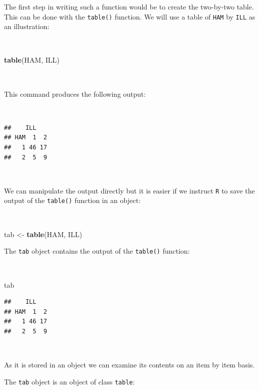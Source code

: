 \documentclass[12pt,a4paper]{book}
\newenvironment{Shaded}{\begin{snugshade}}{\end{snugshade}}
\newcommand{\KeywordTok}[1]{\textcolor[rgb]{0.13,0.29,0.53}{\textbf{#1}}}
\newcommand{\NormalTok}[1]{#1}
\newcommand{\StringTok}[1]{\textcolor[rgb]{0.31,0.60,0.02}{#1}}
\theoremstyle{definition}
\theoremstyle{definition}
\theoremstyle{definition}
\theoremstyle{remark}
\begin{document}
The first step in writing such a function would be to create the
two-by-two table. This can be done with the \texttt{table()} function.
We will use a table of \texttt{HAM} by \texttt{ILL} as an illustration:

~

\begin{Shaded}
\begin{Highlighting}[]
\KeywordTok{table}\NormalTok{(HAM, ILL)}
\end{Highlighting}
\end{Shaded}

~

This command produces the following output:

~

\begin{verbatim}
##    ILL
## HAM  1  2
##   1 46 17
##   2  5  9
\end{verbatim}

~

We can manipulate the output directly but it is easier if we instruct
\texttt{R} to save the output of the \texttt{table()} function in an
object:

~

\begin{Shaded}
\begin{Highlighting}[]
\NormalTok{tab <-}\StringTok{ }\KeywordTok{table}\NormalTok{(HAM, ILL)}
\end{Highlighting}
\end{Shaded}

\newpage

The \texttt{tab} object contains the output of the \texttt{table()}
function:

~

\begin{Shaded}
\begin{Highlighting}[]
\NormalTok{tab}
\end{Highlighting}
\end{Shaded}

\begin{verbatim}
##    ILL
## HAM  1  2
##   1 46 17
##   2  5  9
\end{verbatim}

~

As it is stored in an object we can examine its contents on an item by
item basis.

The \texttt{tab} object is an object of class \texttt{table}:

~
\end{document}
